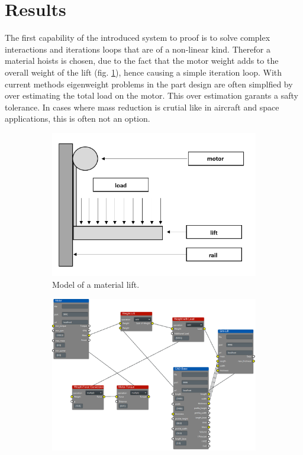 \section{Results}

The first capability of the introduced system to proof is 
to solve complex interactions and iterations loops that are of a non-linear kind.
Therefor a material hoists is chosen, 
due to the fact that the motor weight adds 
to the overall weight of the lift (fig. \ref{pic:lift_model}), 
hence causing a simple iteration loop.
With current methods eigenweight problems in the part design are often simplfied 
by over estimating the total load on the motor.
This over estimation garants a safty tolerance.
In cases where mass reduction is crutial like in aircraft and space applications, this is often not an option.
\begin{figure}[h]
    \centering
    \begin{subfigure}[b]{0.55\textwidth}
        \centering
        \includegraphics[width=\textwidth]{pics/500Z_model.png}
        \caption{\label{pic:lift_model} Model of a material lift.}
    \end{subfigure}
    \hfill
    \begin{subfigure}[b]{0.95\textwidth}
        \centering
        \includegraphics[width=\textwidth]{pics/500Z_solution.png}

\end{subfigure}
\end{figure}
